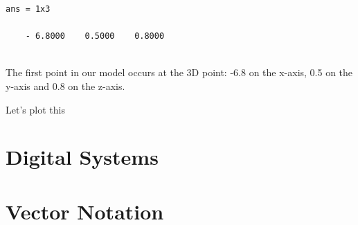 \documentclass[
]{book}
\newlength{\cslhangindent}
\newlength{\cslentryspacingunit} %
\newenvironment{CSLReferences}[2] %
 {%
  \setlength{\parindent}{0pt}
  \ifodd #1
  \let\oldpar\par
  \def\par{\hangindent=\cslhangindent\oldpar}
  \fi
  \setlength{\parskip}{#2\cslentryspacingunit}
 }%
 {}
\theoremstyle{definition}
\theoremstyle{definition}
\theoremstyle{definition}
\theoremstyle{definition}
\theoremstyle{remark}
\begin{document}
\begin{verbatim}
ans = 1x3

    - 6.8000    0.5000    0.8000
    
\end{verbatim}

The first point in our model occurs at the 3D point: -6.8 on the x-axis, 0.5 on the y-axis and 0.8 on the z-axis.

Let's plot this

\hypertarget{refs}{}
\begin{CSLReferences}{0}{0}
\end{CSLReferences}

\hypertarget{appendix-appendix}{%
\appendix}


\hypertarget{digital-systems}{%
\chapter{Digital Systems}\label{digital-systems}}

\hypertarget{vector-notation}{%
\chapter{Vector Notation}\label{vector-notation}}

  
\end{document}

